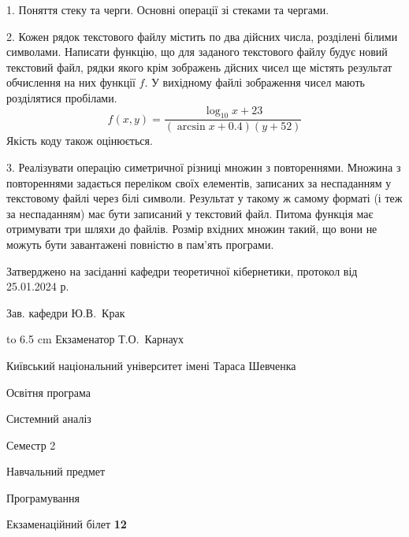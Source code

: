 \documentclass[12pt, ukrainian]{article}
\begin{document}
{%
1. Поняття стеку та черги. Основні операції зі стеками та чергами.%
\par
\vspace{2mm}

2. Кожен рядок текстового файлу містить по два дійсних числа, розділені білими символами.
Написати функцію, що для заданого текстового файлу будує новий текстовий файл, рядки якого крім зображень дйсних чисел ще містять результат обчислення на них функції $f$. У вихідному файлі зображення чисел мають розділятися пробілами. 
$$f(x, y) =\frac{\log_{10} x + 23}{(\arcsin x + 0.4) (y + 52)}$$ 
Якість коду також оцінюється.

\par
\vspace{2mm}

3. Реалізувати операцію симетричної різниці множин з повтореннями. Множина з повтореннями задається переліком своїх елементів, записаних за неспаданням у текстовому файлі через білі символи. Результат у такому ж самому форматі (і теж за неспаданням) має бути записаний у текстовий файл. Питома функція має отримувати три шляхи до файлів. Розмір вхідних множин такий, що вони не можуть бути завантажені повністю в пам’ять програми.

}
{\smallskip\smallskip \begin {scriptsize} Затверджено на засіданні кафедри теоретичної кібернетики, протокол   від   25.01.2024 р.\par\smallskip\smallskip\smallskip\smallskip
{\parbox {6.5 cm} {Зав. кафедри \dotfill Ю.В.~Крак}}\hspace {0.7cm} {\hbox to 6.5 cm { Екзаменатор \dotfill Т.О.~Карнаух}} \end{scriptsize}}
\vspace{0.9cm}
{{\begin {scriptsize}\par
{ \center  Київський національний університет імені Тараса Шевченка \par}
{\parbox {5 cm}{Освітня програма \hfill}{\parbox {7 cm}{Системний аналіз\hfill}}\parbox {6 cm}{\hfill Семестр 2}}\par
{\parbox {5 cm} {Навчальний предмет \hfill}\parbox {7 cm}{Програмування \hfill}\parbox {6cm}{\hfill}\par}\vspace{-15pt} \end{scriptsize}}{\center Екзаменаційний білет \No \textbf { 12 }\par}}
\end{document}
